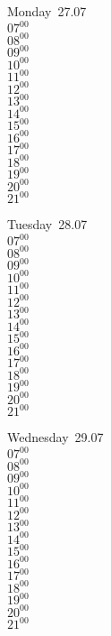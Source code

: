 \documentclass[11pt,a4paper]{book}\usepackage[]{graphicx}\usepackage[]{color}
\begin{document}
\begin{headerbox}
\end{headerbox}
\begin{weekdaybox}
  Monday~27.07\\
  { 
  \vfill
  $07^{00}$\\
$08^{00}$\\
$09^{00}$\\
$10^{00}$\\
$11^{00}$\\
$12^{00}$\\
$13^{00}$\\
$14^{00}$\\
$15^{00}$\\
$16^{00}$\\
$17^{00}$\\
$18^{00}$\\
$19^{00}$\\
$20^{00}$\\
$21^{00}$\\
  }
\end{weekdaybox}
\begin{weekdaybox}
  Tuesday~28.07\\
  { 
  \vfill
  $07^{00}$\\
$08^{00}$\\
$09^{00}$\\
$10^{00}$\\
$11^{00}$\\
$12^{00}$\\
$13^{00}$\\
$14^{00}$\\
$15^{00}$\\
$16^{00}$\\
$17^{00}$\\
$18^{00}$\\
$19^{00}$\\
$20^{00}$\\
$21^{00}$\\
  }
\end{weekdaybox}
\begin{weekdaybox}
  Wednesday~29.07\\
  { 
  \vfill
  $07^{00}$\\
$08^{00}$\\
$09^{00}$\\
$10^{00}$\\
$11^{00}$\\
$12^{00}$\\
$13^{00}$\\
$14^{00}$\\
$15^{00}$\\
$16^{00}$\\
$17^{00}$\\
$18^{00}$\\
$19^{00}$\\
$20^{00}$\\
$21^{00}$\\
  }
\end{weekdaybox}
\end{document}
